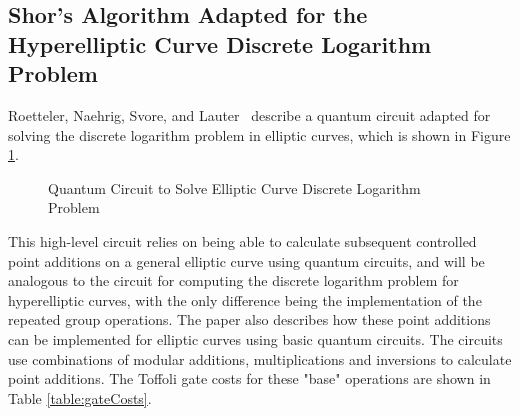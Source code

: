 \subsection{Shor's Algorithm Adapted for the Hyperelliptic Curve Discrete
 Logarithm Problem}
Roetteler, Naehrig, Svore, and Lauter~\cite{roetteler2017quantum} describe a quantum circuit adapted for solving the discrete logarithm problem in elliptic curves, which is shown in Figure \ref{fig:ECDLPcircuit}.
\begin{figure}[!htb]
\centering
\resizebox{\linewidth}{!}{}
\caption{Quantum Circuit to Solve Elliptic Curve Discrete Logarithm Problem~\cite{roetteler2017quantum}}
\label{fig:ECDLPcircuit}
\end{figure} 
This high-level circuit relies on being able to calculate subsequent controlled point additions on a general elliptic curve using quantum circuits, and will be analogous to the circuit for computing the discrete logarithm problem for hyperelliptic curves, with the only difference being the implementation of the repeated group operations. The paper also describes how these point additions can be implemented for elliptic curves using basic quantum circuits. The circuits use combinations of modular additions, multiplications and inversions to calculate point additions. The Toffoli gate costs for these "base" operations are shown in Table \ref{table:gateCosts}. 
\begin{table}
\caption{Costs for modular arithmetic in quantum circuits in terms of $n$, the bit-size of the prime which the group is defined over~\cite{roetteler2017quantum}}
\label{table:gateCosts}
\end{table}
